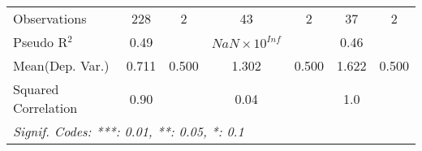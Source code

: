 \begin{tabular}{lcccccc}
   Observations                                               & 228           & 2    & 43                      & 2    & 37           & 2\\  
   Pseudo R$^2$                                               & 0.49          &      & $NaN\times 10^{Inf}$    &      & 0.46         & \\  
Mean(Dep. Var.) & 0.711 & 0.500 & 1.302 & 0.500 & 1.622 & 0.500 \\
   Squared Correlation                                        & 0.90          &      & 0.04                    &      & 1.0          & \\  
   \midrule \midrule
   \multicolumn{7}{l}{\emph{Signif. Codes: ***: 0.01, **: 0.05, *: 0.1}}\\
\end{tabular}
\par\endgroup
